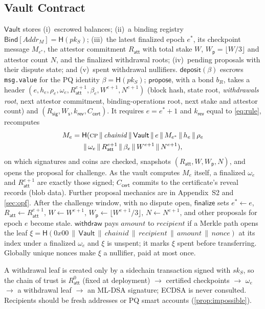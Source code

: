 \documentclass[10pt,journal,compsoc]{IEEEtran}
\theoremstyle{tplain}
\theoremstyle{tdef}
\theoremstyle{remark}
\newcommand{\supp}[1]{Appendix~#1}
\newcommand{\Ws}{W_{\mathsf{s}}}
\newcommand{\Wp}{W_{\mathsf{p}}}
\newcommand{\Rsig}{R_{\mathsf{sig}}}
\newcommand{\Ratt}{R_{\mathsf{att}}}
\newcommand{\kr}{k_{\mathsf{rev}}}
\newcommand{\cert}{\mathsf{cert}}
\newcommand{\Vault}{\mathsf{Vault}}
\newcommand{\Hash}{\mathsf{H}}
\begin{document}
\subsection{Vault Contract}\label{sec:vault}
$\Vault$ stores (i)~escrowed balances; (ii)~a binding registry $\mathsf{Bind}[\mathit{Addr}_M]=\Hash(pk_S)$; (iii)~the latest finalized epoch $e^\ast$, its checkpoint message $M_{e^\ast}$, the attestor commitment $\Ratt$ with total stake $W$, $\Wp=\lfloor W/3\rfloor$ and attestor count $N$, and the finalized withdrawal roots; (iv)~pending proposals with their dispute state; and (v)~spent withdrawal nullifiers. $\mathsf{deposit}(\beta)$ escrows \texttt{msg.value} for the PQ identity $\beta=\Hash(pk_S)$; $\mathsf{propose}$, with a bond $b_R$, takes a header $(e,h_e,\rho_e,\omega_e,\Ratt^{e+1},\beta_e,W^{e+1},N^{e+1})$ (block hash, state root, \emph{withdrawals root}, next attestor commitment, binding-operations root, next stake and attestor count) and $(\Rsig,\Ws,\kr,C_{\cert})$. It requires $e=e^\ast+1$ and $\kr$ equal to \cref{eq:rule}, recomputes
\begin{multline*}
M_e=\Hash(\textsc{cp}\,\|\,\mathit{chainid}\,\|\,\Vault\,\|\,e\,\|\,M_{e^\ast}\,\|\,h_e\,\|\,\rho_e\\\|\,\omega_e\,\|\,\Ratt^{e+1}\,\|\,\beta_e\,\|\,W^{e+1}\,\|\,N^{e+1}),
\end{multline*}
on which signatures and coins are checked, snapshots $(\Ratt,W,\Wp,N)$, and opens the proposal for challenge. As the vault computes $M_e$ itself, a finalized $\omega_e$ and $\Ratt^{e+1}$ are exactly those signed; $C_{\cert}$ commits to the certificate's reveal records (blob data). Further proposal mechanics are in \supp{S2} and \cref{sec:opf}. After the challenge window, with no dispute open, $\mathsf{finalize}$ sets $e^\ast\gets e$, $\Ratt\gets\Ratt^{e+1}$, $W\gets W^{e+1}$, $\Wp\gets\lfloor W^{e+1}/3\rfloor$, $N\gets N^{e+1}$, and other proposals for epoch $e$ become stale. $\mathsf{withdraw}$ pays $\mathit{amount}$ to $\mathit{recipient}$ if a Merkle path opens the leaf $\xi=\Hash(0x00\,\|\,\Vault\,\|\,\mathit{chainid}\,\|\,\mathit{recipient}\,\|\,\mathit{amount}\,\|\,\mathit{nonce})$ at its index under a finalized $\omega_e$ and $\xi$ is unspent; it marks $\xi$ spent before transferring. Globally unique nonces make $\xi$ a nullifier, paid at most once.

A withdrawal leaf is created only by a sidechain transaction signed with $sk_S$, so the chain of trust is $\Ratt^{0}$ (fixed at deployment) $\to$ certified checkpoints $\to$ $\omega_e$ $\to$ a withdrawal leaf $\to$ an ML-DSA signature; ECDSA is never consulted. Recipients should be fresh addresses or PQ smart accounts (\cref{prop:impossible}).
\end{document}
